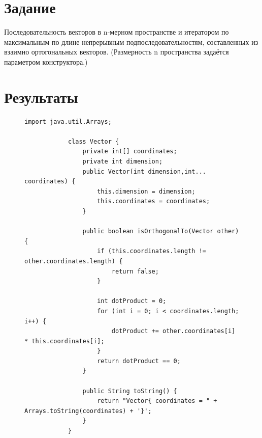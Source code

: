\documentclass[a4paper, 14pt]{extarticle}
\begin{document}
	\renewcommand{\ttdefault}{pcr}
	
	\setlength{\tabcolsep}{3pt}
	\newpage
	\setcounter{page}{2}
	
	\section{Задание}\label{Sect::task}
	
	Последовательность векторов в n-мерном пространстве и итератором по максимальным по
	длине непрерывным подпоследовательностям, составленных из взаимно ортогональных
	векторов. (Размерность n пространства задаётся параметром конструктора.)
	
	\section{Результаты}\label{Sect::res}
	\begin{figure}[!htb]
		\begin{lstlisting}[language={},caption={Вспомогательный класс Vector},label={lst:code1}]
			import java.util.Arrays;
			
			class Vector {
				private int[] coordinates;
				private int dimension;
				public Vector(int dimension,int... coordinates) {
					this.dimension = dimension;
					this.coordinates = coordinates;
				}
				
				public boolean isOrthogonalTo(Vector other) {
					if (this.coordinates.length != other.coordinates.length) {
						return false;
					}
					
					int dotProduct = 0;
					for (int i = 0; i < coordinates.length; i++) {
						dotProduct += other.coordinates[i] * this.coordinates[i];
					}
					return dotProduct == 0;
				}
				
				public String toString() {
					return "Vector{ coordinates = " + Arrays.toString(coordinates) + '}';
				}
			}
			
		\end{lstlisting}
	\end{figure}
	
	\newpage
	
\end{document}
